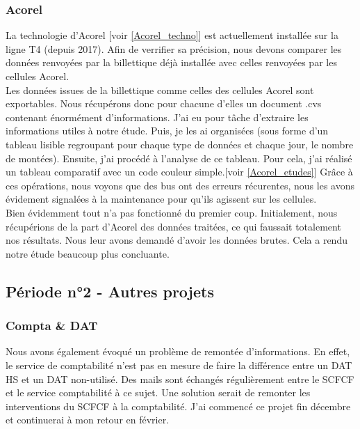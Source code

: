 \documentclass{article}
\begin{document}
        \subsubsection{Acorel}
        La technologie d'Acorel [voir \ref{Acorel_techno}] est actuellement installée sur 
        la ligne T4 (depuis 2017). Afin de verrifier sa précision, nous devons comparer les données renvoyées 
        par la billettique déjà installée avec celles renvoyées par les cellules Acorel. \\
        Les données issues de la billettique comme celles des cellules Acorel sont exportables.
        Nous récupérons donc pour chacune d'elles un document .cvs contenant énormément d'informations.
        J'ai eu pour tâche d'extraire les informations utiles à notre étude. Puis, je les
        ai organisées (sous forme d'un tableau lisible regroupant pour chaque type de données et chaque 
        jour, le nombre de montées). Ensuite, j'ai procédé à l'analyse de ce tableau. Pour cela, j'ai réalisé
        un tableau comparatif avec un code couleur simple.[voir \ref{Acorel_etudes}] Grâce à ces opérations, nous
        voyons que des bus ont des erreurs récurentes, nous les avons évidement signalées à la 
        maintenance pour qu'ils agissent sur les cellules.\\
        Bien évidemment tout n'a pas fonctionné du premier coup. Initialement, nous récupérions de 
        la part d'Acorel des données traitées, ce qui faussait totalement nos résultats. Nous 
        leur avons demandé d'avoir les données brutes. Cela a rendu notre étude beaucoup plus 
        concluante.


    \subsection{Période n°2 - Autres projets}

        \subsubsection{Compta \& DAT}
        Nous avons également évoqué un problème de remontée d'informations. En
        effet, le service de comptabilité n'est pas en mesure de faire la différence entre
        un DAT HS et un DAT non-utilisé. Des mails sont échangés régulièrement entre le 
        SCFCF et le service comptabilité à ce sujet. Une 
        solution serait de remonter les interventions du SCFCF à la comptabilité. J'ai
        commencé ce projet fin décembre et continuerai à mon retour en février.
\end{document}
